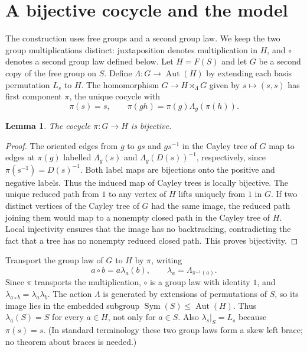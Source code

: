 \documentclass[11pt,a4paper]{article}
\newtheorem{lemma}[theorem]{Lemma}
\DeclareMathOperator{\Aut}{Aut}
\DeclareMathOperator{\Sym}{Sym}
\begin{document}
\section{A bijective cocycle and the model}
The construction uses free groups and a second group law. We keep the two group multiplications distinct: juxtaposition denotes multiplication in $H$, and $\circ$ denotes a second group law defined below. Let $H=F(S)$ and let $G$ be a second copy of the free group on $S$. Define $\Lambda:G\to\Aut(H)$ by extending each basis permutation $L_s$ to $H$. The homomorphism $G\to H\rtimes_\Lambda G$ given by $s\mapsto(s,s)$ has first component $\pi$, the unique cocycle with
\[
\pi(s)=s,\qquad \pi(gh)=\pi(g)\Lambda_g(\pi(h)).
\]
\begin{lemma}\label{cocycle}
The cocycle $\pi:G\to H$ is bijective.
\end{lemma}
\begin{proof}
The oriented edges from $g$ to $gs$ and $gs^{-1}$ in the Cayley tree of $G$ map to edges at $\pi(g)$ labelled $\Lambda_g(s)$ and $\Lambda_g(D(s))^{-1}$, respectively, since $\pi(s^{-1})=D(s)^{-1}$. Both label maps are bijections onto the positive and negative labels. Thus the induced map of Cayley trees is locally bijective. The unique reduced path from $1$ to any vertex of $H$ lifts uniquely from $1$ in $G$. If two distinct vertices of the Cayley tree of $G$ had the same image, the reduced path joining them would map to a nonempty closed path in the Cayley tree of $H$. Local injectivity ensures that the image has no backtracking, contradicting the fact that a tree has no nonempty reduced closed path. This proves bijectivity.
\end{proof}
Transport the group law of $G$ to $H$ by $\pi$, writing
\[
a\circ b=a\lambda_a(b),\qquad \lambda_a=\Lambda_{\pi^{-1}(a)}.
\]
Since $\pi$ transports the multiplication, $\circ$ is a group law with identity $1$, and $\lambda_{a\circ b}=\lambda_a\lambda_b$. The action $\Lambda$ is generated by extensions of permutations of $S$, so its image lies in the embedded subgroup $\Sym(S)\leq\Aut(H)$. Thus $\lambda_a(S)=S$ for every $a\in H$, not only for $a\in S$. Also $\lambda_s|_S=L_s$ because $\pi(s)=s$. (In standard terminology these two group laws form a skew left brace; no theorem about braces is needed.)
\end{document}
